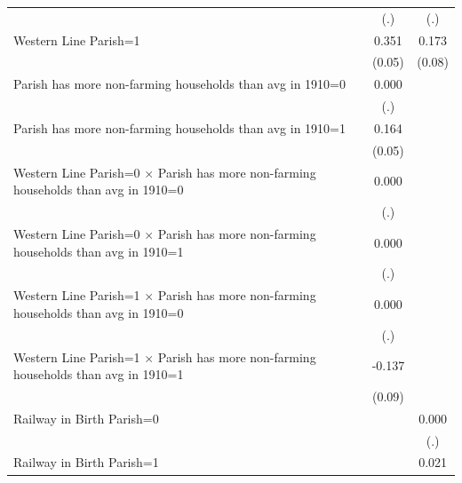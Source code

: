 {\begin{tabular}{l*{3}{c}}
                    &                     &         (.)         &         (.)         \\
Western Line Parish=1&                     &       0.351\sym{***}&       0.173\sym{**} \\
                    &                     &      (0.05)         &      (0.08)         \\
Parish has more non-farming households than avg in 1910=0&                     &       0.000         &                     \\
                    &                     &         (.)         &                     \\
Parish has more non-farming households than avg in 1910=1&                     &       0.164\sym{***}&                     \\
                    &                     &      (0.05)         &                     \\
Western Line Parish=0 $\times$ Parish has more non-farming households than avg in 1910=0&                     &       0.000         &                     \\
                    &                     &         (.)         &                     \\
Western Line Parish=0 $\times$ Parish has more non-farming households than avg in 1910=1&                     &       0.000         &                     \\
                    &                     &         (.)         &                     \\
Western Line Parish=1 $\times$ Parish has more non-farming households than avg in 1910=0&                     &       0.000         &                     \\
                    &                     &         (.)         &                     \\
Western Line Parish=1 $\times$ Parish has more non-farming households than avg in 1910=1&                     &      -0.137         &                     \\
                    &                     &      (0.09)         &                     \\
Railway in Birth Parish=0&                     &                     &       0.000         \\
                    &                     &                     &         (.)         \\
Railway in Birth Parish=1&                     &                     &       0.021         \\

\end{tabular}}
